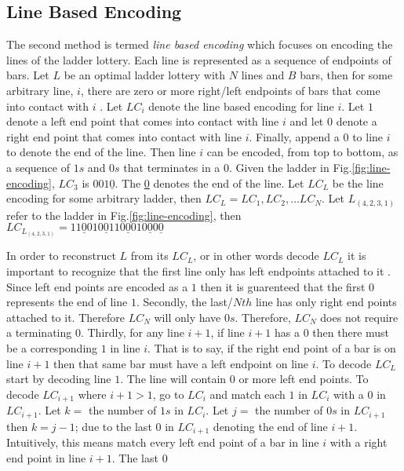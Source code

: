 \subsection{Line Based Encoding}
The second method is termed \emph{line based encoding} which focuses 
on encoding the lines of the ladder lottery. Each line is represented 
as a sequence of endpoints of bars. Let $L$ be an optimal ladder lottery 
with $N$ lines and $B$ bars, then for some arbitrary line, $i$, there 
are zero or more right/left endpoints of bars that 
come into contact with $i$ \cite{A5}. Let $LC_{i}$ denote the line based encoding for line $i$.
Let $1$ denote a left end point that 
comes into contact with line $i$ and let $0$ denote a right 
end point that comes into contact with line $i$. Finally, append a $0$
to line $i$ to denote the end of the line. Then line $i$ can be 
encoded, from top to bottom, as a sequence of $1s$ and $0s$ that 
terminates in a $0$.  Given the ladder in Fig.\ref{fig:line-encoding}, 
$LC_{3}$ is $001\underline{0}$. The \underline{0} denotes 
the end of the line. Let $LC_{L}$ be the line encoding for 
some arbitrary ladder, then $LC_{L}=LC_{1}, LC_{2}, \dots LC_{N}$.
Let $L_{(4,2,3,1)}$ refer to the ladder in Fig.\ref{fig:line-encoding}, then 
$LC_{L_{(4,2,3,1)}}=11\underline{0}010\underline{0}110\underline{0}010\underline{0}0\underline{0}$\par 
In order to reconstruct $L$ from its $LC_{L}$, or in other words decode
$LC_{L}$ it is important to recognize that the first line only has left endpoints attached to it
\cite{A5}. Since left end points are encoded as a $1$ then it is guarenteed that the first $0$ 
represents the end of line $1$. Secondly, the last/$Nth$ line 
has only right end points attached to it.  Therefore $LC_{N}$ will only have $0s$. Therefore, $LC_{N}$
does not require a terminating $0$. Thirdly, for any 
line $i+1$, if line $i+1$ has a $0$ then there must be a corresponding $1$
in line $i$. That is to say, if the right end point of a bar is on line 
$i+1$ then that same bar must have a left endpoint on line $i$. To decode 
$LC_{L}$ start by decoding line $1$. The line will contain $0$ or more 
left end points. To decode $LC_{i+1}$ where $i+1>1$, go to 
$LC_{i}$ and match each $1$ in $LC_{i}$ with a $0$ in $LC_{i+1}$. 
Let $k=$ the number of $1s$ in $LC_{i}$. Let $j=$ the number 
of $0s$ in $LC_{i+1}$ then $k=j-1$; due to the last $0$ in $LC_{i+1}$ denoting 
the end of line $i+1$.  Intuitively, this means match every left end point 
of a bar in line $i$ with a right end point in line $i+1$. The last $0$
